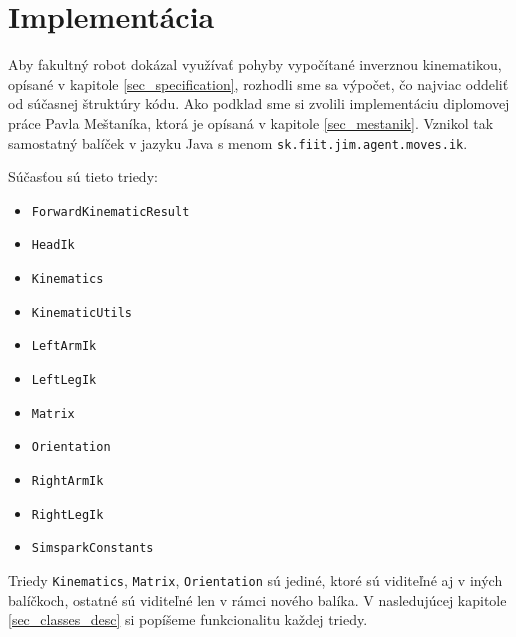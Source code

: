 \section{Implementácia}

Aby fakultný robot dokázal využívať pohyby vypočítané inverznou kinematikou, opísané v kapitole \ref{sec_specification}, rozhodli sme sa výpočet, čo najviac oddeliť od súčasnej štruktúry kódu. Ako podklad sme si zvolili implementáciu diplomovej práce Pavla Meštaníka, ktorá je opísaná v kapitole \ref{sec_mestanik}. Vznikol tak samostatný balíček v jazyku Java s menom \texttt{sk.fiit.jim.agent.moves.ik}. 

Súčasťou sú tieto triedy:
\begin{itemize}
	\item \texttt{ForwardKinematicResult}
	\item \texttt{HeadIk}
	\item \texttt{Kinematics}
	\item \texttt{KinematicUtils}
	\item \texttt{LeftArmIk}
	\item \texttt{LeftLegIk}
	\item \texttt{Matrix}
	\item \texttt{Orientation}
	\item \texttt{RightArmIk}
	\item \texttt{RightLegIk}
	\item \texttt{SimsparkConstants}
\end{itemize}

Triedy \texttt{Kinematics}, \texttt{Matrix}, \texttt{Orientation} sú jediné, ktoré sú viditeľné aj v iných balíčkoch, ostatné sú viditeľné len v rámci nového balíka. V nasledujúcej kapitole \ref{sec_classes_desc} si popíšeme funkcionalitu každej triedy.

